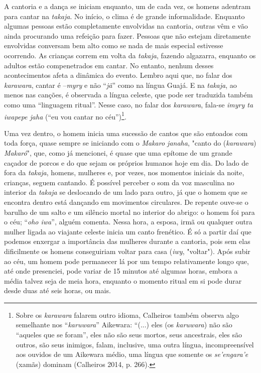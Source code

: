 A cantoria e a dança se iniciam enquanto, um de cada vez, os homens
adentram para cantar na \emph{takaja}. No início, o clima é de grande
informalidade. Enquanto algumas pessoas estão completamente envolvidas
na cantoria, outras vêm e vão ainda procurando uma refeição para fazer.
Pessoas que não estejam diretamente envolvidas conversam bem alto como
se nada de mais especial estivesse ocorrendo. As crianças correm em
volta da \emph{takaja}, fazendo algazarra, enquanto os adultos estão
compenetrados em cantar. No entanto, nenhum desses acontecimentos afeta
a dinâmica do evento. Lembro aqui que, no falar dos \emph{karawara},
cantar é --\emph{myry} e não ``\emph{jã}'' como na língua Guajá. E na
\emph{takaja}, ao menos nas canções, é observada a língua celeste, que
pode ser traduzida também como uma ``linguagem ritual''. Nesse caso, no
falar dos \emph{karawara}, fala-se \emph{imyry ta iwapepe jaha} (``eu
vou cantar no céu'')\footnote{Sobre os \emph{karawara} falarem outro
  idioma, Calheiros também observa algo semelhante nos
  ``\emph{karuwara}'' Aikewara: ``(...) eles (os \emph{karuwara}) não
  são ``aqueles que se foram'', eles não são seus mortos, seus
  ancestrais, eles são outros, são seus inimigos, falam, inclusive, uma
  outra língua, incompreensível aos ouvidos de um Aikewara médio, uma
  língua que somente os \emph{se'engara'e} (xamãs) dominam (Calheiros
  2014, p. 266).}.

Uma vez dentro, o homem inicia uma sucessão de cantos que são entoados
com toda força, quase sempre se iniciando com o \emph{Makaro janaha},
"canto do (\emph{karawara}) \emph{Makaró}", que, como já mencionei, é
quase que uma epítome de um grande caçador de porcos e do que sejam os
próprios humanos hoje em dia. Do lado de fora da \emph{takaja}, homens,
mulheres e, por vezes, nos momentos iniciais da noite, crianças, seguem
cantando. É possível perceber o som da voz masculina no interior da
\emph{takaja} se deslocando de um lado para outro, já que o homem que se
encontra dentro está dançando em movimentos circulares. De repente
ouve-se o barulho de um salto e um silêncio mortal no interior do
abrigo: o homem foi para o céu; ``\emph{oho iwa}'', alguém comenta.
Nessa hora, a esposa, irmã ou qualquer outra mulher ligada ao viajante
celeste inicia um canto frenético. É só a partir daí que podemos
enxergar a importância das mulheres durante a cantoria, pois sem elas
dificilmente os homens conseguiriam voltar para casa (\emph{iwy},
"voltar"). Após subir ao céu, um homem pode permanecer lá por um tempo
relativamente longo que, até onde presenciei, pode variar de 15 minutos
até algumas horas, embora a média talvez seja de meia hora, enquanto o
momento ritual em si pode durar desde duas até seis horas, ou mais.

